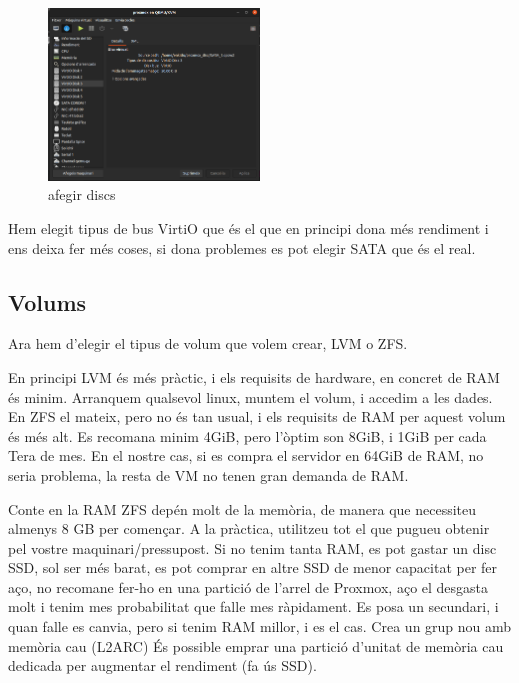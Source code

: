 \documentclass[
  10pt,
]{krantz}
\begin{document}
\begin{figure}
\centering
\includegraphics[width=0.5\textwidth,height=\textheight]{imatges/proxmox/afegir_disc_pro2.png}
\caption{afegir discs}
\end{figure}

Hem elegit tipus de bus VirtiO que és el que en principi dona més rendiment i ens deixa fer més coses, si dona problemes es pot elegir SATA que és el real.

\hypertarget{volums}{%
\subsection{Volums}\label{volums}}

Ara hem d'elegir el tipus de volum que volem crear, LVM o ZFS.

En principi LVM és més pràctic, i els requisits de hardware, en concret de RAM és minim. Arranquem qualsevol linux, muntem el volum, i accedim a les dades. En ZFS el mateix, pero no és tan usual, i els requisits de RAM per aquest volum és més alt. Es recomana minim 4GiB, pero l'òptim son 8GiB, i 1GiB per cada Tera de mes. En el nostre cas, si es compra el servidor en 64GiB de RAM, no seria problema, la resta de VM no tenen gran demanda de RAM.

\begin{rmdcuidao}{Conte en la RAM}
ZFS depén molt de la memòria, de manera que necessiteu almenys 8 GB per començar. A la pràctica, utilitzeu tot el que pugueu obtenir pel vostre maquinari/pressupost. Si no tenim tanta RAM, es pot gastar un disc SSD, sol ser més barat, es pot comprar en altre SSD de menor capacitat per fer aço, no recomane fer-ho en una partició de l'arrel de Proxmox, aço el desgasta molt i tenim mes probabilitat que falle mes ràpidament. Es posa un secundari, i quan falle es canvia, pero si tenim RAM millor, i es el cas. Crea un grup nou amb memòria cau (L2ARC) És possible emprar una partició d'unitat de memòria cau dedicada per augmentar el rendiment (fa ús SSD).

\end{rmdcuidao}
\end{document}
